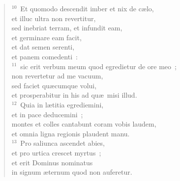 \begin{verse}
${}^{10}$~Et quomodo descendit imber et nix de c\ae lo,\\ et illuc ultra non revertitur,\\ sed inebriat terram, et infundit eam,\\ et germinare eam facit,\\ et dat semen serenti,\\ et panem comedenti~:\\
${}^{11}$~sic erit verbum meum quod egredietur de ore meo~;\\ non revertetur ad me vacuum,\\ sed faciet qu\ae cumque volui,\\ et prosperabitur in his ad qu\ae\ misi illud.\\
${}^{12}$~Quia in l\ae titia egrediemini,\\ et in pace deducemini~;\\ montes et colles cantabunt coram vobis laudem,\\ et omnia ligna regionis plaudent manu.\\
${}^{13}$~Pro saliunca ascendet abies,\\ et pro urtica crescet myrtus~;\\ et erit Dominus nominatus\\ in signum \ae ternum quod non auferetur.\end{verse}


